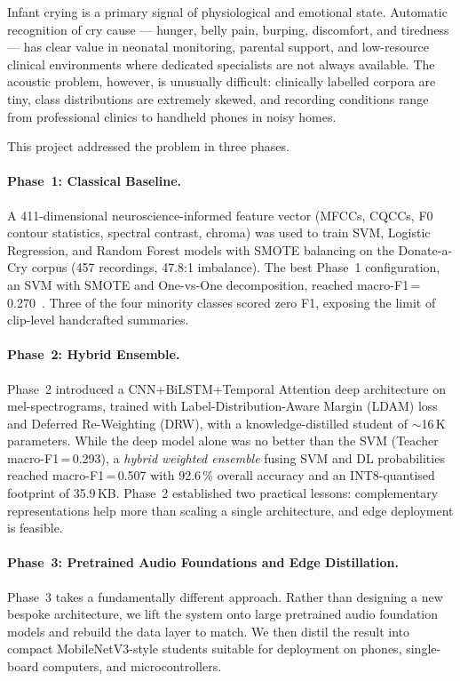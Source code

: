 \documentclass[11pt,a4paper]{article}
\begin{document}
Infant crying is a primary signal of physiological and emotional state.
Automatic recognition of cry cause --- hunger, belly pain, burping,
discomfort, and tiredness --- has clear value in neonatal monitoring,
parental support, and low-resource clinical environments where
dedicated specialists are not always available. The acoustic problem,
however, is unusually difficult: clinically labelled corpora are tiny,
class distributions are extremely skewed, and recording conditions
range from professional clinics to handheld phones in noisy homes.

This project addressed the problem in three phases.

\paragraph{Phase~1: Classical Baseline.}
A 411-dimensional neuroscience-informed feature vector (MFCCs, CQCCs, F0
contour statistics, spectral contrast, chroma) was used to train SVM,
Logistic Regression, and Random Forest models with SMOTE balancing on
the Donate-a-Cry corpus (457 recordings, 47.8:1 imbalance). The best
Phase~1 configuration, an SVM with SMOTE and One-vs-One decomposition,
reached macro-F1\,=\,0.270~\cite{phase1report}. Three of the four
minority classes scored zero F1, exposing the limit of clip-level
handcrafted summaries.

\paragraph{Phase~2: Hybrid Ensemble.}
Phase~2 introduced a CNN+BiLSTM+Temporal Attention deep architecture on
mel-spectrograms, trained with Label-Distribution-Aware Margin (LDAM)
loss and Deferred Re-Weighting (DRW), with a knowledge-distilled student
of $\sim$16\,K parameters. While the deep model alone was no better than
the SVM (Teacher macro-F1\,=\,0.293), a \emph{hybrid weighted ensemble}
fusing SVM and DL probabilities reached macro-F1\,=\,0.507 with 92.6\,\%
overall accuracy and an INT8-quantised footprint of 35.9\,KB. Phase~2
established two practical lessons: complementary representations help
more than scaling a single architecture, and edge deployment is
feasible.

\paragraph{Phase~3: Pretrained Audio Foundations and Edge Distillation.}
Phase~3 takes a fundamentally different approach. Rather than designing a
new bespoke architecture, we lift the system onto large pretrained audio
foundation models and rebuild the data layer to match. We then distil
the result into compact MobileNetV3-style students suitable for
deployment on phones, single-board computers, and microcontrollers.
\end{document}
